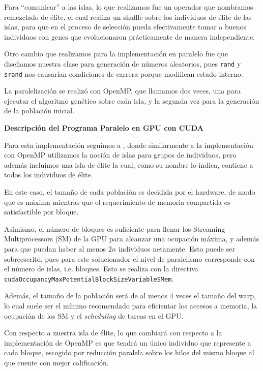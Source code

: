 \documentclass[main.tex]{subfiles}
\begin{document}
Para ``comunicar'' a las islas, lo que realizamos fue un operador que nombramos
remezclado de élite, el cual realiza un shuffle sobre los individuos de élite
de las islas, para que en el proceso de selección pueda efectivamente tomar a
buenos individuos con genes que evolucionaron prácticamente de manera
independiente.

Otro cambio que realizamos para la implementación en paralelo fue que diseñamos
nuestra clase para generación de números aleatorios, pues \texttt{rand} y
\texttt{srand} nos causarían condiciones de carrera porque modifican estado
interno.

La paralelización se realizó con OpenMP, que llamamos dos veces, una para
ejecutar el algoritmo genético sobre cada isla, y la segunda vez para la
generación de la población inicial.

\begin{cajaEnunciado}
    \textbf{Descripción del Programa Paralelo en GPU con CUDA}
\end{cajaEnunciado}

Para esta implementación seguimos a \parencite{ipn_gpu}, donde similarmente a
la implementación con OpenMP utilizamos la noción de islas para grupos de
individuos, pero además incluimos una isla de élite la cual, como su nombre lo
indica, contiene a todos los individuos de élite.

En este caso, el tamaño de cada población es decidida por el hardware, de modo
que es máxima mientras que el requerimiento de memoria compartida es
satisfactible por bloque.

Asímismo, el número de bloques es suficiente para llenar los Streaming
Multiprocessors (SM) de la GPU para alcanzar una ocupación máxima, y además
para que puedan haber al menos $2n$ individuos netamente. Esto puede ser
sobreescrito, pues para este solucionador el nivel de paralelismo corresponde
con el número de islas, i.e. bloques. Esto se realiza con la directiva
\mbox{\texttt{cudaOccupancyMaxPotentialBlockSizeVariableSMem}}.

Además, el tamaño de la población será de al menos 4 veces el tamaño del warp,
lo cual suele ser el mínimo recomendado para eficientar los accesos a memoria,
la ocupación de los SM y el \textit{scheduling} de tareas en el GPU.
\parencite{cudaworks}

Con respecto a nuestra isla de élite, lo que cambiará con respecto a la
implementación de OpenMP es que tendrá un único individuo que represente a cada
bloque, escogido por reducción paralela sobre los hilos del mismo bloque al que
cuente con mejor calificación.
\end{document}
